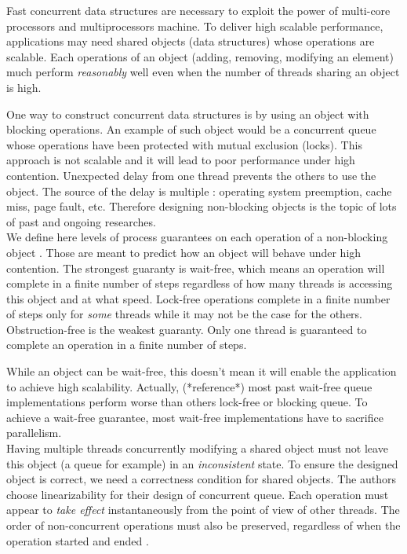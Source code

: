 Fast concurrent data structures are necessary to exploit the power of multi-core
processors and multiprocessors machine. To deliver high scalable performance,
applications may need shared objects (data structures) whose operations are
scalable. Each operations of an object (adding, removing, modifying an element)
much perform \textit{reasonably} well even when the number of threads sharing an
object is high.

One way to construct concurrent data structures is by using an object with
blocking operations. An example of such object would be a concurrent queue whose
operations have been protected with mutual exclusion (locks). This approach is
not scalable and it will lead to poor performance under high contention.
Unexpected delay from one thread prevents the others to use the object. The
source of the delay is multiple : operating system preemption, cache miss, page
fault, etc. Therefore designing non-blocking objects is the topic of lots of
past and ongoing researches. \\

 We define here levels of process guarantees
on each operation of a non-blocking object \cite{Yang:2016:WQF:3016078.2851168}.
Those are meant to predict how an object will behave under high contention. The
strongest guaranty is wait-free, which means an operation will complete in a
finite number of steps regardless of how many threads is accessing this object
and at what speed. Lock-free operations complete in a finite number of steps
only for \textit{some} threads while it may not be the case for the others.
Obstruction-free is the weakest guaranty. Only one thread is guaranteed to
complete an operation in a finite number of steps.

While an object can be wait-free, this doesn't mean it will enable the
application to achieve high scalability. Actually, (*reference*) most past
wait-free queue implementations perform worse than others lock-free or blocking
queue. To achieve a wait-free guarantee, most wait-free implementations have to
sacrifice parallelism. \\

 Having multiple threads concurrently modifying a shared object must not leave
this object (a queue for example) in an \textit{inconsistent} state. To ensure
the designed object is correct, we need a correctness condition for shared
objects. The authors choose linearizability for their design of concurrent
queue. Each operation must appear to \textit{take effect} instantaneously from
the point of view of other threads. The order of non-concurrent operations must
also be preserved, regardless of when the operation started and ended
\cite{Herlihy:1990:LCC:78969.78972}.

